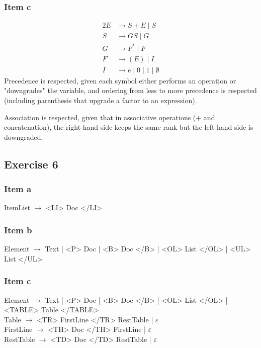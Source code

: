 {\subsubsection{Item c}
\begin{alignat*}{2}
	E &\rightarrow S+E\mid S \\
	S &\rightarrow GS\mid G \\
	G &\rightarrow F^*\mid F \\
	F &\rightarrow (E)\mid I \\
	I &\rightarrow e\mid 0\mid 1\mid \emptyset
\end{alignat*}
Precedence is respected, given each symbol either performs an operation or "downgrades" the variable, and ordering from less to more precedence is respected (including parenthesis that upgrade a factor to an expression).\par
Association is respected, given that in associative operations (+ and concatenation), the right-hand side keeps the same rank but the left-hand side is downgraded.
\subsection{Exercise 6}
\subsubsection{Item a}
ItemList $\rightarrow$ <LI> Doc </LI>
\subsubsection{Item b}
Element $\rightarrow$ Text | <P> Doc | <B> Doc </B> | <OL> List </OL> | <UL> List </UL>
\subsubsection{Item c}
Element $\rightarrow$ Text | <P> Doc | <B> Doc </B> | <OL> List </OL> | <TABLE> Table </TABLE>\\
Table $\rightarrow$ <TR> FirstLine </TR> RestTable | $\varepsilon$\\
FirstLine $\rightarrow$ <TH> Doc </TH> FirstLine | $\varepsilon$\\
RestTable $\rightarrow$ <TD> Doc </TD> RestTable | $\varepsilon$
}

